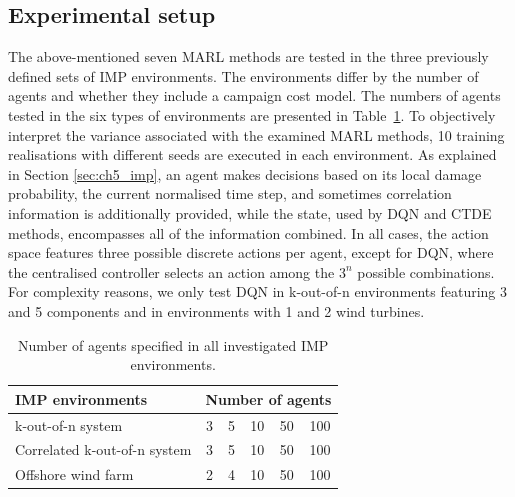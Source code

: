 \subsection{Experimental setup}

The above-mentioned seven MARL methods are tested in the three previously defined sets of IMP environments.
The environments differ by the number of agents and whether they include a campaign cost model.
The numbers of agents tested in the six types of environments are presented in Table~\ref{tab:experiments_details}.
To objectively interpret the variance associated with the examined MARL methods, 10 training realisations with different seeds are executed in each environment.
As explained in Section \ref{sec:ch5_imp}, an agent makes decisions based on its local damage probability, the current normalised time step, and sometimes correlation information is additionally provided, while the state, used by DQN and CTDE methods, encompasses all of the information combined.
In all cases, the action space features three possible discrete actions per agent, except for DQN, where the centralised controller selects an action among the $3^n$ possible combinations.
For complexity reasons, we only test DQN in k-out-of-n environments featuring 3 and 5 components and in environments with 1 and 2 wind turbines.

\begin{table}[t]
  \caption{Number of agents specified in all investigated IMP environments.}
    \label{tab:experiments_details}
  \centering
    \begin{tabular}{lccccc}
    \toprule
    IMP environments & \multicolumn{5}{l}{Number of agents}  \\
     \midrule
    k-out-of-n system & 3 & 5 & 10 & 50 & 100 \\
     Correlated k-out-of-n system & 3 & 5 & 10 & 50 & 100 \\
     Offshore wind farm & 2 & 4 & 10 & 50 & 100  \\
    \bottomrule
    \end{tabular}
\end{table}

